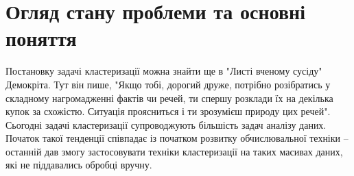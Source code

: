 \chapter{Огляд стану проблеми та основні поняття}\label{ch:01}

Постановку задачі кластеризації можна знайти ще в "Листі вченому сусіду" Демокріта. Тут він пише, "Якщо тобі, дорогий друже, потрібно розібратись у складному нагромадженні фактів чи речей, ти спершу розклади їх на декілька купок за схожістю. Ситуація проясниться і ти зрозумієш природу цих речей". 
Сьогодні задачі кластеризації супроводжують більшість задач аналізу даних. Початок такої тенденції співпадає із початком розвитку обчислювальної техніки -- останній дав змогу застосовувати техніки кластеризації на таких масивах даних, які не піддавались обробці вручну.
